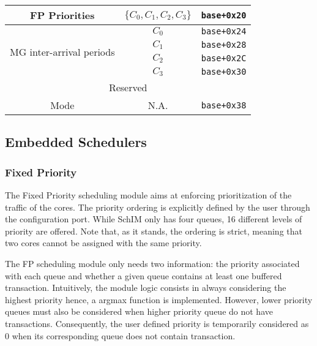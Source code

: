 \begin{table}[!ht]
\begin{tabular}{|c||c|c|}
                FP Priorities                                & $\{C_{0}, C_{1}, C_{2}, C_{3}\}$          & \verb|base+0x20|                    \\ \hline
                \multirow{4}{*}{MG inter-arrival periods} & $C_{0}$                                   & \verb|base+0x24|                    \\ \cline{2-3} 
                                                          & $C_{1}$                                   & \verb|base+0x28|                    \\ \cline{2-3} 
                                                          & $C_{2}$                                   & \verb|base+0x2C|                    \\ \cline{2-3} 
                                                          & $C_{3}$                                   & \verb|base+0x30|                    \\ \hline
                \multicolumn{3}{|c|}{Reserved}                                                                                              \\ \hline
                Mode                                      & N.A.                                      & \verb|base+0x38|                    \\ \hline
            \end{tabular}
        \end{table}

        
    \subsection{Embedded Schedulers}
        
        \subsubsection{Fixed Priority}
            The Fixed Priority scheduling module aims at enforcing prioritization of the traffic of the cores. The priority ordering is explicitly defined by the user through the configuration port. While SchIM only has four queues, 16 different levels of priority are offered. Note that, as it stands, the ordering is strict, meaning that two cores cannot be assigned with the same priority.
          
            The FP scheduling module only needs two information: the priority associated with each queue and whether a given queue contains at least one buffered transaction. Intuitively, the module logic consists in always considering the highest priority hence, a argmax function is implemented. However, lower priority queues must also be considered when higher priority queue do not have transactions. Consequently, the user defined priority is temporarily considered as 0 when its corresponding queue does not contain transaction.
        
